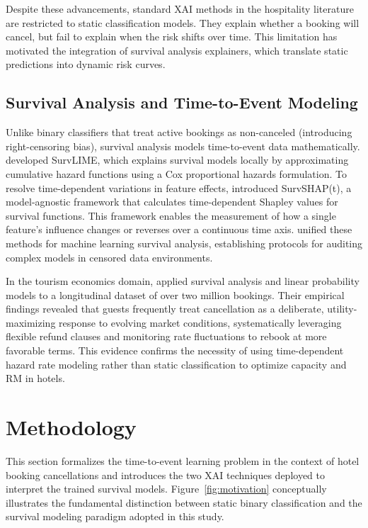 \documentclass[pdflatex,sn-mathphys-ay]{sn-jnl}%
\theoremstyle{thmstyleone}%
\theoremstyle{thmstyletwo}%
\theoremstyle{thmstylethree}%
\begin{document}
Despite these advancements, standard XAI methods in the hospitality literature are restricted to static classification models. They explain whether a booking will cancel, but fail to explain when the risk shifts over time. This limitation has motivated the integration of survival analysis explainers, which translate static predictions into dynamic risk curves.

\subsection{Survival Analysis and Time-to-Event Modeling}
Unlike binary classifiers that treat active bookings as non-canceled (introducing right-censoring bias), survival analysis models time-to-event data mathematically. \cite{kovalev2020survlime} developed SurvLIME, which explains survival models locally by approximating cumulative hazard functions using a Cox proportional hazards formulation. To resolve time-dependent variations in feature effects, \cite{krzyzinski2023survshapt} introduced SurvSHAP(t), a model-agnostic framework that calculates time-dependent Shapley values for survival functions. This framework enables the measurement of how a single feature's influence changes or reverses over a continuous time axis. \cite{langbein2025interpretable} unified these methods for machine learning survival analysis, establishing protocols for auditing complex models in censored data environments.

In the tourism economics domain, \cite{mir2026decoding} applied survival analysis and linear probability models to a longitudinal dataset of over two million bookings. Their empirical findings revealed that guests frequently treat cancellation as a deliberate, utility-maximizing response to evolving market conditions, systematically leveraging flexible refund clauses and monitoring rate fluctuations to rebook at more favorable terms. This evidence confirms the necessity of using time-dependent hazard rate modeling rather than static classification to optimize capacity and RM in hotels.

\section{Methodology} %
\label{sec:methodology}



This section formalizes the time-to-event learning problem in the context of hotel booking cancellations and introduces the two XAI techniques deployed to interpret the trained survival models. Figure~\ref{fig:motivation} conceptually illustrates the fundamental distinction between static binary classification and the survival modeling paradigm adopted in this study.
\end{document}
